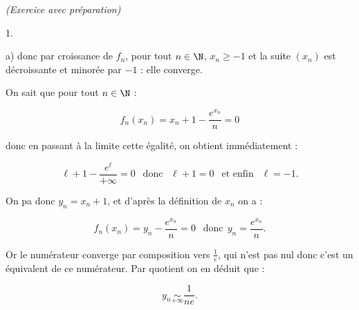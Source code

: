 \documentclass[11pt]{article}%
\begin{document}
\begin{exercice}{\it (Exercice avec préparation)}
\begin{noliste}{1.}
\begin{noliste}{a)}
 donc par croissance de $f_{n}$, pour tout $n \in \N$, $x_{n} \geq -1$
et la suite $(x_{n})$ est décroissante et minorée par $-1$ : elle
converge. \\

 \item On sait que pour tout $n \in \N$ : 
 
\[
 f_{n} (x_{n} ) = x_{n} + 1 - \frac{ e^{ x_{n} } }{ n } = 0 
\]

 donc en passant à la limite cette égalité, on obtient immédiatement : 
 
\[
 \ell + 1 - \frac{ e^{ \ell } }{ + \infty } = 0 \ \ \text{ donc } \ \
\ell + 1 = 0 \ \ \text{ et enfin } \ \ \ell = -1. 
\]

 \end{noliste}

 \item On pa donc $y_{n} = x_{n} + 1$, et d'après la définition de
$x_{n}$ on a : 
 
\[
 f_{n} (x_{n} ) = y_{n} - \frac{ e^{ x_{n} } }{ n } = 0 \ \ \text{ donc
} \ \ y_{n} = \frac{ e^{ x_{n} } }{ n }. 
\]

 Or le numérateur converge par composition vers $\frac{ 1 }{ e }$, qui
n'est pas nul donc c'est un équivalent de ce numérateur. Par quotient
on en déduit que : 
 
\[
 y_{n} \underset{ + \infty }{ \sim } \frac{ 1 }{ n e }. 
\]

 \end{noliste}
 \end{exercice}

 \newpage
\end{document}
